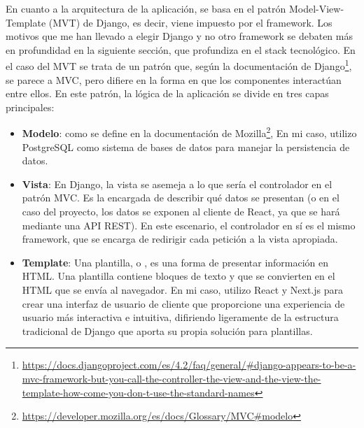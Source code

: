 En cuanto a la arquitectura de la aplicación, se basa en el patrón Model-View-Template (MVT) de Django, es decir, viene impuesto por el framework. Los motivos que me han llevado a elegir Django y no otro framework se debaten más en profundidad en la siguiente sección, que profundiza en el stack tecnológico. En el caso del MVT se trata de un patrón que, según la documentación de Django\footnote{\url{https://docs.djangoproject.com/es/4.2/faq/general/\#django-appears-to-be-a-mvc-framework-but-you-call-the-controller-the-view-and-the-view-the-template-how-come-you-don-t-use-the-standard-names}}, se parece a MVC, pero difiere en la forma en que los componentes interactúan entre ellos. En este patrón, la lógica de la aplicación se divide en tres capas principales:

\begin{itemize}
    \item \textbf{Modelo}: como se define en la documentación de Mozilla\footnote{\url{https://developer.mozilla.org/es/docs/Glossary/MVC#modelo}},  En mi caso, utilizo PostgreSQL como sistema de bases de datos para manejar la persistencia de datos.

    \item \textbf{Vista}: En Django, la vista se asemeja a lo que sería el controlador en el patrón MVC. Es la encargada de describir qué datos se presentan (o en el caso del proyecto, los datos se exponen al cliente de React, ya que se hará mediante una API REST). En este escenario, el controlador en sí es el mismo framework, que se encarga de redirigir cada petición a la vista apropiada.

    \item \textbf{Template}: Una plantilla, o , es una forma de presentar información en HTML. Una plantilla contiene bloques de texto y  que se convierten en el HTML que se envía al navegador. En mi caso, utilizo React y Next.js para crear una interfaz de usuario de cliente que proporcione una experiencia de usuario más interactiva e intuitiva, difiriendo ligeramente de la estructura tradicional de Django que aporta su propia solución para plantillas.
\end{itemize}



